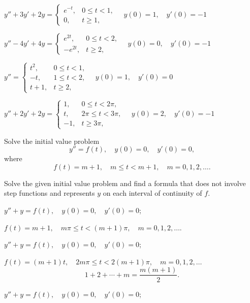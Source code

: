 \begin{exerciselist}
\item\label{exer:8.5.17}$y''+3y'+2y=\begin{cases}
e^{-t},&0\le t<1,\\
0,&t\ge 1,
\end{cases}\quad y(0)=1,\quad y'(0)=-1$

\item\label{exer:8.5.18}$y''-4y'+4y=\begin{cases}
e^{2t},&0\le t<2,\\
-e^{2t},&t\ge 2,
\end{cases}\quad y(0)=0,\quad y'(0)=-1$

\item\label{exer:8.5.19}\CGex $y''=\begin{cases}
t^2,&0\le t<1,\\
-t,&1\le t<2,\\
t+1,&t\ge 2,
\end{cases}\quad y(0)=1,\quad y'(0)=0$

\item\label{exer:8.5.20}$y''+2y'+2y=\begin{cases}
1,&0\le t<2\pi,\\
t,&2\pi\le t<3\pi,\\
-1,&t\ge 3\pi,
\end{cases}\quad y(0)=2,\quad y'(0)=-1$

\item\label{exer:8.5.21}Solve the initial value problem \[ y''=f(t), \quad
y(0)=0,\quad  y'(0)=0, \] where \[ f(t)=m+1,\quad m\le t<m+1,\quad
m=0,1,2,\dots. \]

\item\label{exer:8.5.22}Solve the given initial value problem and find a
formula that does not involve step functions and represents $y$ on
each interval of continuity of $f$.
\begin{alist}
\item %
$y''+y=f(t), \quad  y(0)=0,\quad  y'(0)=0$;

$f(t)=m+1,\quad  m\pi\le t<(m+1)\pi,\quad m=0,1,2,\dots$.

\item %
$y''+y=f(t), \quad  y(0)=0,\quad y'(0)=0$;

$f(t)=(m+1)t, \quad   2m\pi\le t<2(m+1)\pi,\quad m=0,1,2,\dots$
\[
1+2+\cdots+m=\frac{m(m+1)}{2}.
\]

\item %
$y''+y=f(t), \quad  y(0)=0,\quad  y'(0)=0$;


\end{alist}
\end{exerciselist}
